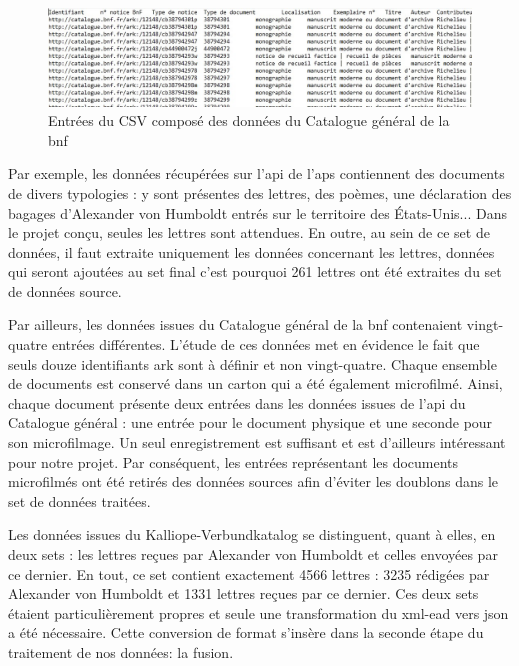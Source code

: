 \documentclass[a4paper, 12pt, twoside]{book}
\begin{document}
\begin{figure}[h!]
    \centering
    \caption{Entrées du CSV composé des données du Catalogue général de la \gls{bnf}}
    \includegraphics[scale=0.5]{img/bnfcsv.jpg}
    \hfill
\end{figure}


Par exemple, les données récupérées sur l'\gls{api} de l'\gls{aps} contiennent des documents de divers typologies : y sont présentes des lettres, des poèmes, une déclaration des bagages d'Alexander von Humboldt entrés sur le territoire des États-Unis... Dans le projet conçu, seules les lettres sont attendues. En outre, au sein de ce set de données, il faut extraite uniquement les données concernant les lettres, données qui seront ajoutées au set final c'est pourquoi 261 lettres ont été extraites du set de données source.

Par ailleurs, les données issues du Catalogue général de la \gls{bnf} contenaient vingt-quatre entrées différentes. L'étude de ces données met en évidence le fait que seuls douze identifiants \gls{ark} sont à définir et non vingt-quatre. Chaque ensemble de documents est conservé dans un carton qui a été également microfilmé. Ainsi, chaque document présente deux entrées dans les données issues de l'\gls{api} du Catalogue général : une entrée pour le document physique et une seconde pour son microfilmage. Un seul enregistrement est suffisant et est d'ailleurs intéressant pour notre projet. Par conséquent, les entrées représentant les documents microfilmés ont été retirés des données sources afin d'éviter les doublons dans le set de données traitées.

Les données issues du Kalliope-Verbundkatalog se distinguent, quant à elles, en deux sets : les lettres reçues par Alexander von Humboldt et celles envoyées par ce dernier. En tout, ce set contient exactement 4566 lettres : 3235 rédigées par Alexander von Humboldt et 1331 lettres reçues par ce dernier. Ces deux sets étaient particulièrement propres et seule une transformation du \gls{xml}-\gls{ead} vers \gls{json} a été nécessaire. Cette conversion de format s'insère dans la seconde étape du traitement de nos données: la fusion. 
\end{document}
